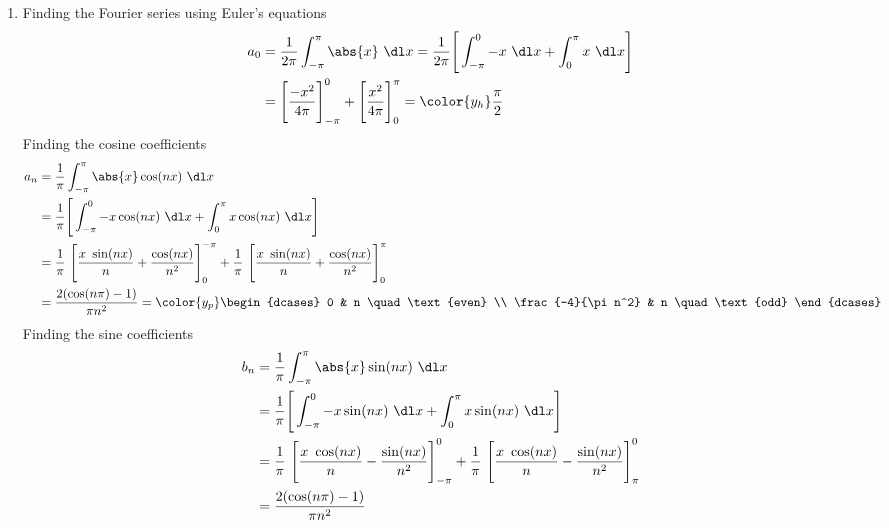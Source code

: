 \begin{enumerate}
    \item Finding the Fourier series using Euler's equations
          \begin{align}
              a_0 & = \frac{1}{2\pi} \int_{-\pi}^{\pi} \abs{x}\ \dl x
              = \frac{1}{2\pi} \Bigg[\int_{-\pi}^{0} -x\ \dl x
              +  \int_{0}^{\pi} x\ \dl x\Bigg]                        \\
                  & = \Bigg[ \frac{-x^2}{4\pi} \Bigg]_{-\pi}^0
              + \Bigg[ \frac{x^2}{4\pi} \Bigg]_0^{\pi} = \color{y_h} \frac{\pi}{2}
          \end{align}
          Finding the cosine coefficients
          \begin{align}
              a_n & = \frac{1}{\pi} \int_{-\pi}^{\pi} \abs{x} \cos(nx)\ \dl x \\
                  & = \frac{1}{\pi} \Bigg[\int_{-\pi}^{0} -x \cos(nx)\ \dl x
              +  \int_{0}^{\pi} x \cos(nx)\ \dl x\Bigg]                       \\
                  & = \frac{1}{\pi}\ \Bigg[ \frac{x\ \sin(nx)}{n}
                  + \frac{\cos(nx)}{n^2} \Bigg]_{0}^{-\pi}
              + \frac{1}{\pi}\ \Bigg[ \frac{x\ \sin(nx)}{n}
              + \frac{\cos(nx)}{n^2} \Bigg]_0^{\pi}                           \\
                  & = \frac{2(\cos(n\pi) - 1)}{\pi n^2}
              = \color{y_p} \begin{dcases}
                                0                  & n \quad \text{even} \\
                                \frac{-4}{\pi n^2} & n \quad \text{odd}
                            \end{dcases}
          \end{align}
          Finding the sine coefficients
          \begin{align}
              b_n & = \frac{1}{\pi} \int_{-\pi}^{\pi} \abs{x} \sin(nx)\ \dl x \\
                  & = \frac{1}{\pi} \Bigg[\int_{-\pi}^{0} -x \sin(nx)\ \dl x
              +  \int_{0}^{\pi} x \sin(nx)\ \dl x\Bigg]                       \\
                  & = \frac{1}{\pi}\ \Bigg[ \frac{x\ \cos(nx)}{n}
                  - \frac{\sin(nx)}{n^2} \Bigg]_{-\pi}^{0}
              + \frac{1}{\pi}\ \Bigg[ \frac{x\ \cos(nx)}{n}
              - \frac{\sin(nx)}{n^2} \Bigg]_{\pi}^{0}                         \\
                  & = \frac{2(\cos(n\pi) - 1)}{\pi n^2}

\end{align}
\end{enumerate}
